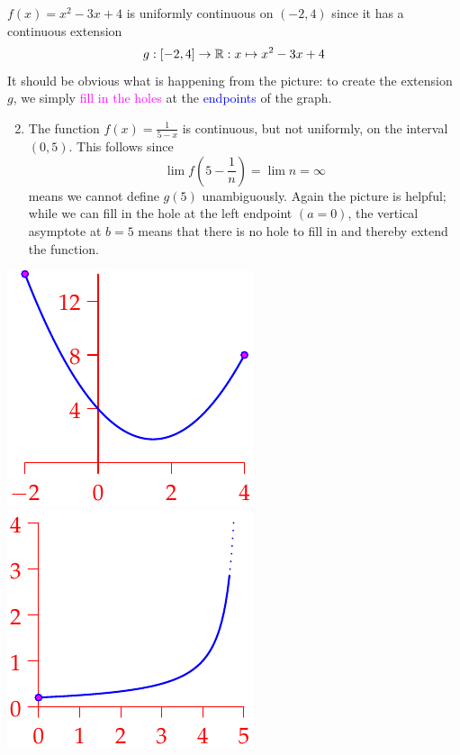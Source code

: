 \begin{examples}[lower separated=false, sidebyside, sidebyside align=top seam, sidebyside gap=0pt, righthand width=0.3\linewidth]{}{}
	\exstart $f(x)=x^2-3x+4$ is uniformly continuous on $(-2,4)$ since it has a continuous extension
	\[g:[-2,4]\to\mathbb{R}:x\mapsto x^2-3x+4\]
	It should be obvious what is happening from the picture: to create the extension $g$, we simply \textcolor{Magenta}{fill in the holes} at the \textcolor{blue}{endpoints} of the graph.   
	\bigskip\smallskip
	\begin{enumerate}\setcounter{enumi}{1}
	  \item The function $f(x)=\frac 1{5-x}$ is continuous, but not uniformly, on the interval $(0,5)$. This follows since
		\[\lim f\left(5-\frac 1n\right)=\lim n=\infty\]
		means we cannot define $g(5)$ unambiguously. Again the picture is helpful; while we can fill in the hole at the left endpoint $(a=0)$, the vertical asymptote at $b=5$ means that there is no hole to fill in and thereby extend the function.
	\end{enumerate}
	\tcblower
	\flushright\includegraphics{unifcont3}\\
	\includegraphics{unifcont4}
\end{examples}

